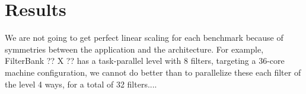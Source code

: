 \section{Results}

We are not going to get perfect linear scaling for each benchmark
because of symmetries between the application and the
architecture. For example, FilterBank ?? X ?? has a task-parallel
level with 8 filters, targeting a 36-core machine configuration, we
cannot do better than to parallelize these each filter of the level 4
ways, for a total of 32 filters....